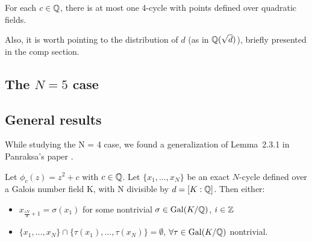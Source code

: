 \begin{theorem}
  For each $c \in \mathbb{Q}$, there is at most one 4-cycle with points
	defined over quadratic fields.
\end{theorem}

Also, it is worth pointing to the distribution of $d$ (as in
$\mathbb{Q}(\sqrt{d})$), briefly presented in the comp section.

\subsection{The $N = 5$ case}

\subsection{General results}

While studying the N = 4 case, we found a generalization of Lemma~2.3.1
in Panraksa's paper \cite{MR2982105}.

\begin{theorem}
	Let $\phi_c(z) = z^2 + c$ with $c \in \mathbb{Q}$. Let $\{x_1, \ldots, x_{N}\}$ be
	an exact $N$-cycle defined over a Galois number field K, with N 
	divisible by	$d = [K:\mathbb{Q} ]$. Then either: \\
	\begin{itemize}
	\item $x_{\frac{iN}{d}+1} = \sigma(x_1)$ for some nontrivial $\sigma \in
	\mathrm{Gal}(K/\mathbb{Q})$, $i \in \mathbb{Z}$
	\item $\{x_1, \ldots, x_{N}\} \cap \{\tau(x_1), \ldots, \tau(x_{N})\} =
	\emptyset$, $\forall \tau \in \mathrm{Gal}(K/\mathbb{Q})$ nontrivial.
	\end{itemize}
\end{theorem}

